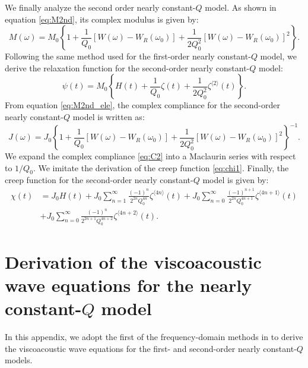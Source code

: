 \documentclass[article]{./macros/elsarticle_qh}
\begin{document}
We finally analyze the second order nearly constant-$Q$ model. As shown in equation \ref{eq:M2nd}, its complex modulus is given by:
\begin{equation} \label{eq:M2nd_ele}
M(\omega) = M_{0} \left \{
1 + \frac{1}{Q_{0}} \left[W(\omega) - W_{R}(\omega_{0}) \right] 
+ \frac{1}{2Q_{0}^2} 
\left[W(\omega) - W_{R}(\omega_{0}) \right]^2
\right \}.
\end{equation}
Following the same method used for the first-order nearly constant-$Q$ model, we derive the relaxation function for the second-order nearly constant-$Q$ model:
\begin{equation} \label{eq:psi2_tmp}
\psi(t) = M_{0} \left \{
H(t) + \frac{1}{Q_{0}} \zeta(t) 
+ \frac{1}{2Q_{0}^2} \zeta^{\langle 2 \rangle}(t) 
\right \}.
\end{equation}
From equation \ref{eq:M2nd_ele}, the complex compliance for the second-order nearly constant-$Q$ model is written as:
\begin{equation} \label{eq:C2} 
J(\omega) = J_{0} \left \{
1 + \frac{1}{Q_{0}} \left[W(\omega) - W_{R}(\omega_{0}) \right] 
+ \frac{1}{2Q_{0}^2} 
\left[W(\omega) - W_{R}(\omega_{0}) \right]^2
\right \}^{-1} .
\end{equation}
We expand the complex compliance \ref{eq:C2} into a Maclaurin series with respect to $1/Q_{0}$. We imitate the derivation of the creep function \ref{eq:chi1}. Finally, the creep function for the second-order nearly constant-$Q$ model is given by:
\begin{equation}
\begin{aligned}
\chi(t) & = J_{0} H(t) + 
J_{0} \sum_{n=1}^{\infty} 
\frac{(-1)^n}{2^{2n} Q_{0}^{4n}} \zeta^{\langle 4n \rangle}(t) 
+ J_{0} \sum_{n=0}^{\infty} 
\frac{(-1)^{n+1}}{2^{2n} Q_{0}^{4n+1}} \zeta^{\langle 4n+1 \rangle}(t)  \\
& + J_{0} \sum_{n=0}^{\infty} 
\frac{(-1)^n}{2^{2n+1} Q_{0}^{4n+2}} \zeta^{\langle 4n+2 \rangle}(t) .
\end{aligned}
\end{equation}

\section{Derivation of the viscoacoustic wave equations for the nearly constant-$Q$ model}
In this appendix, we adopt the first of the frequency-domain methods in \cite{hao.greenhalgh:2019} to derive the viscoacoustic wave equations for the first- and second-order nearly constant-$Q$ models. 
\end{document}
